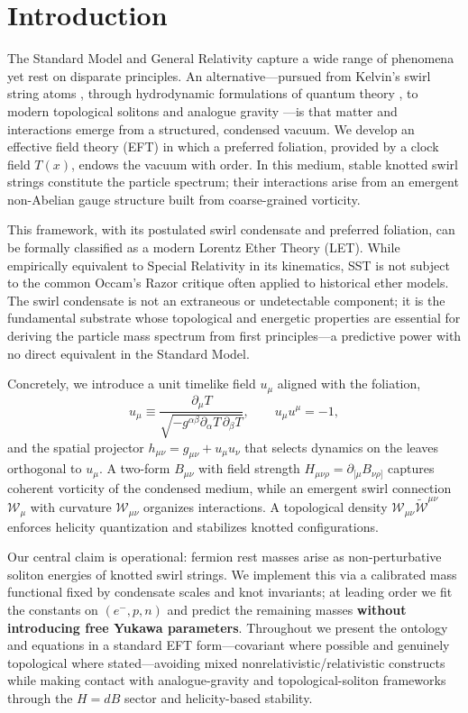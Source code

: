 \documentclass[11pt, preprint,titlepage]{revtex4-2}
\begin{document}
	\section{Introduction}

		The Standard Model and General Relativity capture a wide range of phenomena yet rest on disparate principles. An alternative—pursued from Kelvin’s swirl string atoms \cite{Kelvin1867}, through hydrodynamic formulations of quantum theory \cite{Madelung1927}, to modern topological solitons and analogue gravity \cite{Faddeev1997,Arnold1998,Barcelo2011,Volovik2003,Kleckner2013}—is that matter and interactions emerge from a structured, condensed vacuum. We develop an effective field theory (EFT) in which a preferred foliation, provided by a clock field \(T(x)\), endows the vacuum with order. In this medium, stable knotted swirl strings constitute the particle spectrum; their interactions arise from an emergent non-Abelian gauge structure built from coarse-grained vorticity.


		This framework, with its postulated swirl condensate and preferred foliation, can be formally classified as a modern Lorentz Ether Theory (LET). While empirically equivalent to Special Relativity in its kinematics, SST is not subject to the common Occam's Razor critique often applied to historical ether models. The swirl condensate is not an extraneous or undetectable component; it is the fundamental substrate whose topological and energetic properties are essential for deriving the particle mass spectrum from first principles—a predictive power with no direct equivalent in the Standard Model.

		Concretely, we introduce a unit timelike field \(u_\mu\) aligned with the foliation,
		\[
			u_\mu \equiv \frac{\partial_\mu T}{\sqrt{-g^{\alpha\beta}\partial_\alpha T\,\partial_\beta T}},
			\qquad u_\mu u^\mu = -1,
		\]
		and the spatial projector \(h_{\mu\nu}=g_{\mu\nu}+u_\mu u_\nu\) that selects dynamics on the leaves orthogonal to \(u_\mu\). A two-form \(B_{\mu\nu}\) with field strength \(H_{\mu\nu\rho}=\partial_{[\mu}B_{\nu\rho]}\) captures coherent vorticity of the condensed medium, while an emergent swirl connection \(\mathcal{W}_\mu\) with curvature \(\mathcal{W}_{\mu\nu}\) organizes interactions. A topological density \(\mathcal{W}_{\mu\nu}\tilde{\mathcal{W}}^{\mu\nu}\) enforces helicity quantization and stabilizes knotted configurations.

		Our central claim is operational: fermion rest masses arise as non-perturbative soliton energies of knotted swirl strings. We implement this via a calibrated mass functional fixed by condensate scales and knot invariants; at leading order we fit the constants on \((e^-,p,n)\) and predict the remaining masses \textbf{without introducing free Yukawa parameters}. Throughout we present the ontology and equations in a standard EFT form—covariant where possible and genuinely topological where stated—avoiding mixed nonrelativistic/relativistic constructs while making contact with analogue-gravity and topological-soliton frameworks through the \(H=dB\) sector and helicity-based stability.
\end{document}
